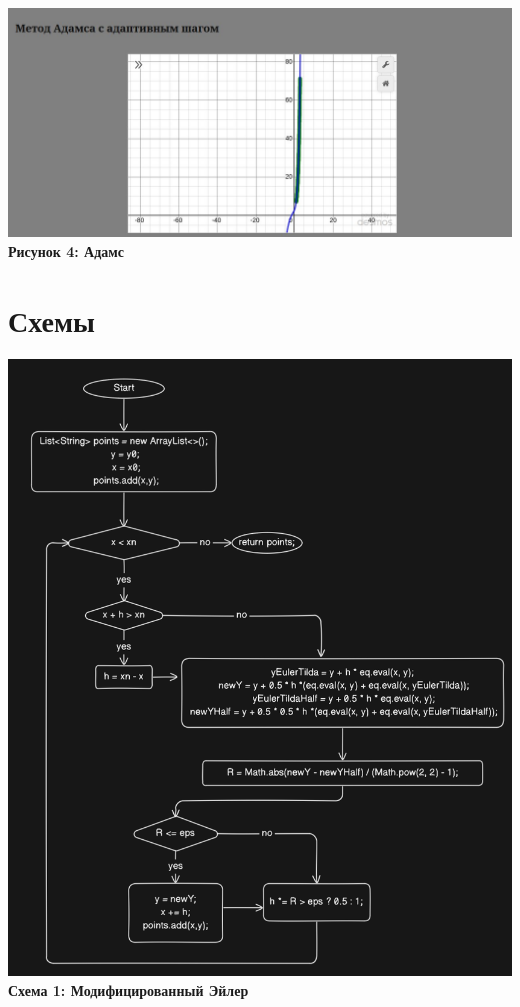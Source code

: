 \documentclass{article}
\begin{document}
\begin{center}
    \includegraphics[width=.9\textwidth]{adams.jpg}\\
    \textbf{Рисунок 4: Адамс}
\end{center}

\section{Схемы}
\begin{center}
    \includegraphics[width=.9\textwidth]{eulerS.png}\\
    \textbf{Схема 1: Модифицированный Эйлер}
\end{center}
\end{document}
